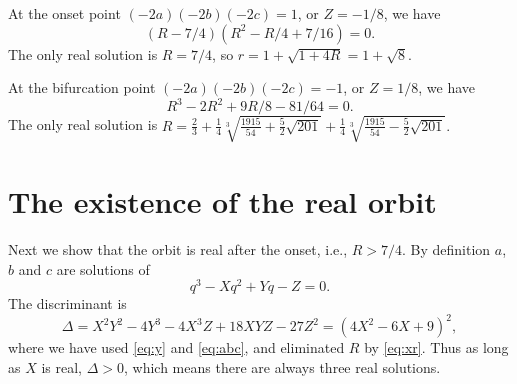 \documentclass[12pt]{article}
\begin{document}
At the onset point $(-2a)(-2b)(-2c) = 1$, or $Z = -1/8$, we have
\[
  (R-7/4) (R^2 - R/4 + 7/16) = 0.
\]
The only real solution is $R = 7/4$, so $r = 1+\sqrt{1+4R} = 1+ \sqrt 8$.

At the bifurcation point $(-2a)(-2b)(-2c) = -1$, or $Z = 1/8$, we have
\[
  R^3 - 2 R^2 + 9R/8 - 81/64 = 0.
\]
The only real solution is
$
R = \frac{2}{3}
  +\frac{1}{4} \sqrt[3]{ \frac{1915}{54} + \frac{5}{2} \sqrt{201}}
  +\frac{1}{4} \sqrt[3]{ \frac{1915}{54} - \frac{5}{2} \sqrt{201}}.
$

\section{The existence of the real orbit}

Next we show that the orbit is real after the onset, i.e., $R>7/4$.
By definition $a$, $b$ and $c$ are solutions of
\[
  q^3 - X q^2 + Y q - Z = 0.
\]
The discriminant is
\[
\Delta = X^2 Y^2 - 4 Y^3 - 4 X^3 Z + 18 X Y Z - 27 Z^2
  = (4X^2 - 6X + 9)^2,
\]
where we have used \eqref{eq:y} and \eqref{eq:abc},
and eliminated $R$ by \eqref{eq:xr}.
Thus as long as $X$ is real, $\Delta > 0$, which means there are always three
real solutions.
\end{document}
